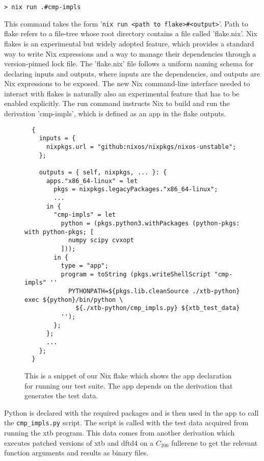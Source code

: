 \begin{verbatim}
> nix run .#cmp-impls
\end{verbatim}


This command takes the form '\verb|nix run <path to flake>#<output>|'. Path to flake refers to a file-tree whose root directory contains a file called 'flake.nix'. Nix flakes is an experimental but widely adopted feature, which provides a standard way to write Nix expressions and a way to manage their dependencies through a version-pinned lock file. The 'flake.nix' file follows a uniform naming schema for declaring inputs and outputs, where inputs are the dependencies, and outputs are Nix expressions to be exposed.
The new Nix command-line interface needed to interact with flakes is naturally also an experimental feature that has to be enabled explicitly. The run command instructs Nix to build and run the derivation 'cmp-impls', which is defined as an app in the flake outputs.

\begin{figure}[H]
\begin{verbatim}
  {
    inputs = {
      nixpkgs.url = "github:nixos/nixpkgs/nixos-unstable";
    };

    outputs = { self, nixpkgs, ... }: {
      apps."x86_64-linux" = let
        pkgs = nixpkgs.legacyPackages."x86_64-linux";
        ...
      in {
        "cmp-impls" = let
          python = (pkgs.python3.withPackages (python-pkgs: with python-pkgs; [
            numpy scipy cvxopt
          ]));
        in {
          type = "app";
          program = toString (pkgs.writeShellScript "cmp-impls" ''
            PYTHONPATH=${pkgs.lib.cleanSource ./xtb-python} exec ${python}/bin/python \
              ${./xtb-python/cmp_impls.py} ${xtb_test_data}
          '');
        };
      };
      ...
    };
  }
\end{verbatim}
\caption{This is a snippet of our Nix flake which shows the app declaration for running our test suite. The app depends on the derivation that generates the test data.}
\label{fig:nix-flake}
\end{figure}

Python is declared with the required packages and is then used in the app to call the \verb|cmp_impls.py| script. The script is called with the test data acquired from running the xtb program. This data comes from another derivation which executes patched versions of xtb and dftd4 on a $C_{200}$ fullerene to get the relevant function arguments and results as binary files.

